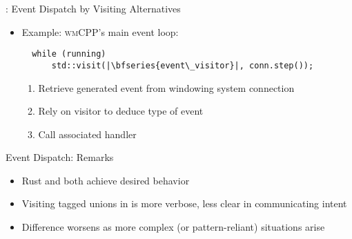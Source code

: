 \begin{frame}[fragile]{\underline{\cpp}: Event Dispatch by Visiting Alternatives \hfill {\footnotesize \currentname}}


    \begin{itemize}

        \item Example: \textsc{wmCPP}'s main event loop:\\
\begin{verbatim}
  while (running)
      std::visit(|\bfseries{event\_visitor}|, conn.step());
\end{verbatim}

    \vspace*{5pt}\begin{enumerate}

        \item Retrieve generated event from windowing system connection

        \item Rely on visitor to deduce type of event

        \item Call associated handler

    \end{enumerate}

    \end{itemize}

    \vfill

\end{frame}

\begin{frame}[fragile]{Event Dispatch: Remarks \hfill {\footnotesize \currentname}}

    \begin{itemize}

        \item Rust and \cpp both achieve desired behavior

        \item Visiting tagged unions in \cpp is more verbose, less clear in communicating intent

        \item Difference worsens as more complex (or pattern-reliant) situations arise

    \end{itemize}

    \vfill

\end{frame}
